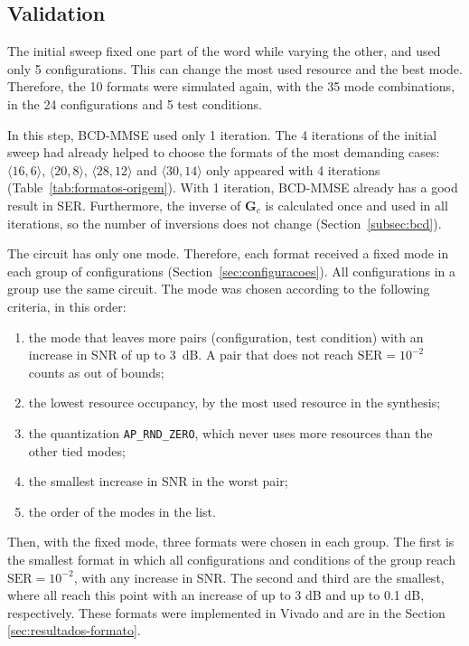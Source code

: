 \subsection{\texorpdfstring{Validation}{Validation}}
The initial sweep fixed one part of the word while varying the other, and used only 5 configurations. This can change the most used resource and the best mode. Therefore, the 10 formats were simulated again, with the 35 mode combinations, in the 24 configurations and 5 test conditions.

In this step, BCD-MMSE used only 1 iteration. The 4 iterations of the initial sweep had already helped to choose the formats of the most demanding cases: $\langle 16,6\rangle$, $\langle 20,8\rangle$, $\langle 28,12\rangle$ and $\langle 30,14\rangle$ only appeared with 4 iterations (Table~\ref{tab:formatos-origem}). With 1 iteration, BCD-MMSE already has a good result in SER. Furthermore, the inverse of $\mathbf G_c$ is calculated once and used in all iterations, so the number of inversions does not change (Section~\ref{subsec:bcd}).

The circuit has only one mode. Therefore, each format received a fixed mode in each group of configurations (Section~\ref{sec:configuracoes}). All configurations in a group use the same circuit. The mode was chosen according to the following criteria, in this order:

\begin{enumerate}

\item the mode that leaves more pairs (configuration, test condition) with an increase in SNR of up to 3~dB. A pair that does not reach $\mathrm{SER} = 10^{-2}$ counts as out of bounds;
\item the lowest resource occupancy, by the most used resource in the synthesis;
\item  the quantization \texttt{AP\_RND\_ZERO}, which never uses more resources than the other tied modes;

\item the smallest increase in SNR in the worst pair;
\item the order of the modes in the list.

\end{enumerate}

Then, with the fixed mode, three formats were chosen in each group. The first is the smallest format in which all configurations and conditions of the group reach $\mathrm{SER} = 10^{-2}$, with any increase in SNR. The second and third are the smallest, where all reach this point with an increase of up to 3 dB and up to 0.1 dB, respectively. These formats were implemented in Vivado and are in the Section \ref{sec:resultados-formato}.